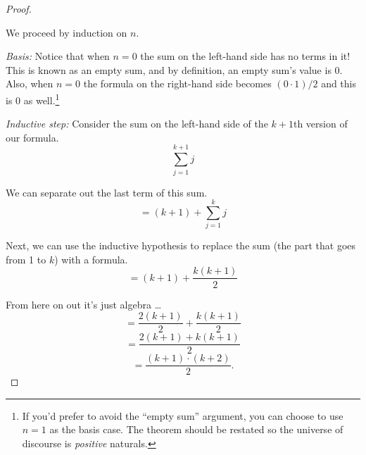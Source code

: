 \documentclass[10pt,]{book}
\theoremstyle{plain}
\theoremstyle{definition}
\theoremstyle{definition}
\numberwithin{equation}{section}
\begin{document}
\begin{proof}\hypertarget{proof-28}{}

      We proceed by induction on \(n\).
\par

      \emph{Basis: } Notice that when \(n=0\) the sum on the left-hand side
      has no terms in it! This is known as an  empty sum, and by
      definition, an empty sum's value is \(0\). Also, when
      \(n=0\) the formula on the right-hand side becomes \((0 \cdot 1)/2\) and this is
      \(0\) as well.\footnote{If you'd prefer to avoid the ``empty sum'' argument, 
      you can choose to use \(n=1\) as the basis case.  The theorem should 
      be restated so the universe of discourse is \emph{positive} naturals.\label{fn-33}}
\par

      \emph{Inductive step: } Consider the sum on the left-hand side of
      the \(k+1\)\textendash{}th version of our formula.
      \begin{equation*}
        \sum_{j=1}^{k+1} j
      \end{equation*}
\par

      We can separate out the last term of this sum.
      \begin{equation*}
        = (k+1) + \sum_{j=1}^{k} j
      \end{equation*}
\par

      Next, we can use the inductive hypothesis to replace the sum (the part
      that goes from 1 to \(k\)) with a formula.
      \begin{equation*}
        = (k+1) + \frac{k(k+1)}{2}
      \end{equation*}
\par

      From here on out it's just algebra \dots{}
      \begin{equation*}
        = \frac{2(k+1)}{2} + \frac{k(k+1)}{2}
      \end{equation*}
      \begin{equation*}
        = \frac{2(k+1) + k(k+1)}{2}
      \end{equation*}
      \begin{equation*}
        = \frac{(k+1) \cdot (k+2)}{2}.
      \end{equation*}
\end{proof}
\par
\end{document}
